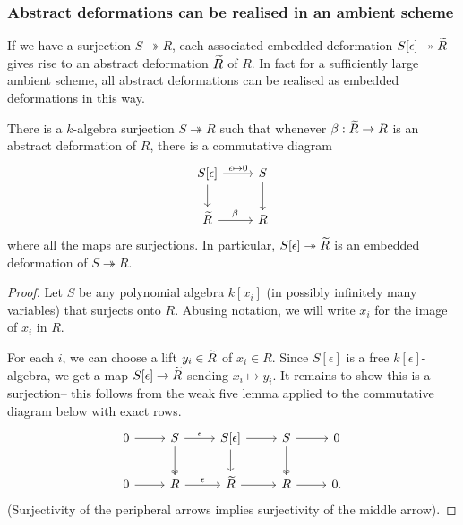 \subsubsection{Abstract deformations can be realised in an ambient scheme} 
If we have a surjection \(S\twoheadrightarrow R\), each associated embedded
deformation \(S[\epsilon]\twoheadrightarrow \widetilde{R}\) gives rise to an abstract
deformation \(\widetilde{R}\) of \(R\). In fact for a sufficiently large ambient
scheme, all abstract deformations can be realised as embedded deformations in this way.

\begin{proposition}\label{all-defs-are-embedded}
    There is a \(k\)-algebra surjection \(S\twoheadrightarrow R\) such that
    whenever \(\beta:\widetilde{R}\rightarrow R\) is an abstract deformation of \(R\),
    there is a commutative diagram 
    \[\begin{tikzcd}
        S[\epsilon] \arrow[r, "\epsilon \mapsto 0"] \arrow[d] & S \arrow[d]  \\
        \wt{R} \arrow[r, "\beta"] & R
    \end{tikzcd}\]
    where all the maps are surjections. In particular,
    \(S[\epsilon]\twoheadrightarrow \widetilde{R}\) is an embedded deformation of
    \(S\twoheadrightarrow R\).
    \begin{proof}
        Let \(S\) be any polynomial algebra \(k[x_i]\) (in possibly infinitely
        many variables) that surjects onto \(R\).
        Abusing notation, we will write \(x_i\) for the image of \(x_i\) in
        \(R\).  

        For each $i$, we can choose a lift $y_i\in\widetilde{R}$ of $x_i\in R$. Since
        \(S[\epsilon]\) is a free \(k[\epsilon]\)-algebra, we get a map
        \(S[\epsilon]\rightarrow \widetilde{R}\) sending \(x_i\mapsto y_i\). It remains
        to show this is a surjection-- this follows from the weak five lemma applied
        to the commutative diagram below with exact rows.         
        \[\begin{tikzcd}
            0 \arrow[r]& S \arrow[r,"\epsilon"] \arrow[d, two heads] & S[\epsilon] \arrow[r]
            \arrow[d] & S \arrow[r] \arrow[d, two heads] & 0 \\
            0 \arrow[r]& R \arrow[r, "\epsilon"] & \wt{R} \arrow[r] & R \arrow[r] & 0.
        \end{tikzcd}\] 
        (Surjectivity of the peripheral arrows implies surjectivity of the middle arrow).
    \end{proof}
\end{proposition}

